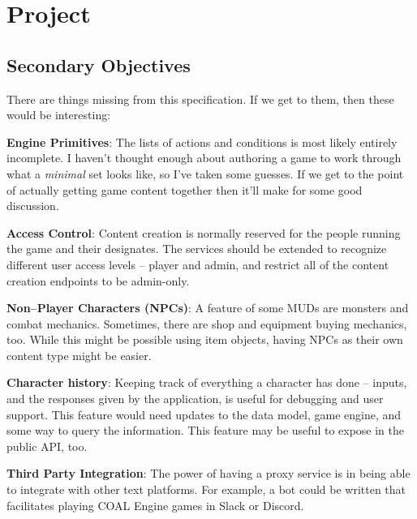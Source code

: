 \documentclass{article}
\newcommand{\enterProblemHeader}[1]{
}
\newcommand{\exitProblemHeader}[1]{
\nobreak\extramarks{#1}{}\nobreak
}
\newcounter{homeworkProblemCounter} %
\newcommand{\homeworkProblemName}{}
\newenvironment{homeworkProblem}[1][Problem \arabic{homeworkProblemCounter}]{ %
\stepcounter{homeworkProblemCounter} %
\renewcommand{\homeworkProblemName}{#1} %
\section{\homeworkProblemName} %
\enterProblemHeader{\homeworkProblemName} %
}{
\exitProblemHeader{\homeworkProblemName} %
}
\newcommand{\homeworkSectionName}{}
\newenvironment{homeworkSection}[1]{ %
\renewcommand{\homeworkSectionName}{#1} %
\subsection{\homeworkSectionName} %
\enterProblemHeader{\homeworkProblemName\ [\homeworkSectionName]} %
}{
\enterProblemHeader{\homeworkProblemName} %
}
\begin{document}
\begin{homeworkProblem}[Project]
\begin{homeworkSection}{Secondary Objectives}
	There are things missing from this specification. If we get to them, then these would be interesting:
	\begin{compactitem}
		\item \textbf{Engine Primitives}: The lists of actions and conditions is most likely entirely incomplete. I haven't thought enough about authoring a game to work through what a \textit{minimal} set looks like, so I've taken some guesses. If we get to the point of actually getting game content together then it'll make for some good discussion.
		\item \textbf{Access Control}: Content creation is normally reserved for the people running the game and their designates. The services should be extended to recognize different user access levels -- player and admin, and restrict all of the content creation endpoints to be admin-only.
		\item \textbf{Non--Player Characters (NPCs)}: A feature of some MUDs are monsters and combat mechanics. Sometimes, there are shop and equipment buying mechanics, too. While this might be possible using item objects, having NPCs as their own content type might be easier.
		\item \textbf{Character history}: Keeping track of everything a character has done -- inputs, and the responses given by the application, is useful for debugging and user support. This feature would need updates to the data model, game engine, and some way to query the information. This feature may be useful to expose in the public API, too.
		\item \textbf{Third Party Integration}: The power of having a proxy service is in being able to integrate with other text platforms. For example, a bot could be written that facilitates playing COAL Engine games in Slack or Discord.
	\end{compactitem}
\end{homeworkSection}

\end{homeworkProblem}
\end{document}
